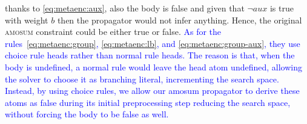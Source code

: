 \documentclass[preprint,authoryear]{elsarticle}
\theoremstyle{definition}
\begin{document}
thanks to \eqref{eq:metaenc:aux}, also the body is false
and given that $\lnot \mathit{aux}$ is true with weight $b$ then the propagator would not infer anything. Hence, the original \textsc{amosum} constraint could be either true or false.
\textcolor{blue}{
As for the rules~\eqref{eq:metaenc:group}, \eqref{eq:metaenc:lb}, and \eqref{eq:metaenc:group-aux},
they use choice rule heads rather than normal rule heads. The reason is that, when the body is undefined, a normal rule would leave the head atom undefined, allowing the solver to choose it as branching literal, incrementing the search space. Instead, by using choice rules, we allow our amosum propagator to derive these atoms as false during its initial preprocessing step reducing the search space, without forcing the body to be false as well.}
\end{document}
